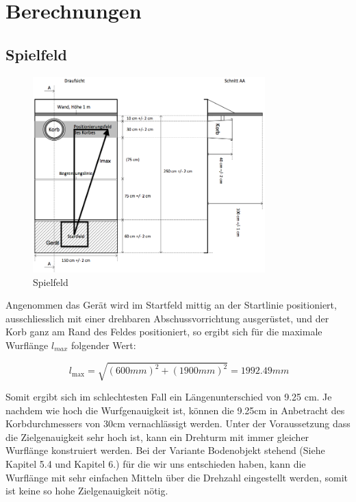 \section{Berechnungen}
\label{sec:calc}

\subsection{Spielfeld}
\begin{figure}[h!]          
    \centering             
    \includegraphics[width=0.8\textwidth]{fig/Bild_Spielfeld.png}    
    \caption{Spielfeld}
    \label{fig:spielfeld}        
\end{figure}
\noindent
Angenommen das Gerät wird im Startfeld mittig an der Startlinie positioniert, 
ausschliesslich mit einer drehbaren Abschussvorrichtung ausgerüstet, und der 
Korb ganz am Rand des Feldes positioniert, so ergibt sich für die maximale 
Wurflänge $l_{max}$ folgender Wert: 

\[\ l_\text{max} = \sqrt{(600mm)^2 + (1900mm)^2} = 1992.49mm \]

Somit ergibt sich im schlechtesten Fall ein Längenunterschied von  9.25 cm. 
Je nachdem wie hoch die Wurfgenauigkeit ist, können die 9.25cm in 
Anbetracht des Korbdurchmessers von 30cm vernachlässigt werden. Unter der Voraussetzung 
dass die Zielgenauigkeit sehr hoch ist, kann ein Drehturm mit immer gleicher Wurflänge 
konstruiert werden. Bei der Variante Bodenobjekt stehend (Siehe Kapitel 5.4 und Kapitel 6.) für die wir 
uns entschieden haben, kann die Wurflänge mit sehr einfachen Mitteln über die Drehzahl
eingestellt werden, somit ist keine so hohe Zielgenauigkeit nötig.

